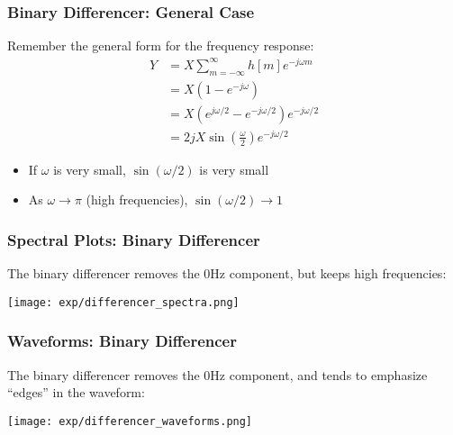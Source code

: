 \documentclass{beamer}
\begin{document}
\begin{frame}
  \frametitle{Binary Differencer: General Case}

  Remember the general form for the frequency response:
  \begin{align*}
    Y &= X\sum_{m=-\infty}^\infty h[m]e^{-j\omega m}\\
    &= X\left(1-e^{-j\omega}\right)\\
    &= X\left(e^{j\omega/2}-e^{-j\omega/2}\right)e^{-j\omega/2}\\
    &= 2jX\sin\left(\frac{\omega}{2}\right)e^{-j\omega/2}
  \end{align*}
  \begin{itemize}
  \item If $\omega$ is very small, $\sin(\omega/2)$ is very small
  \item As $\omega\rightarrow\pi$ (high frequencies), $\sin(\omega/2)\rightarrow 1$
  \end{itemize}
\end{frame}

\begin{frame}
  \frametitle{Spectral Plots: Binary Differencer}

  The binary differencer removes the 0Hz component, but keeps high frequencies:
  \centerline{\texttt{[image: exp/differencer\_spectra.png]}}
\end{frame}

\begin{frame}
  \frametitle{Waveforms: Binary Differencer}

  The binary differencer removes the 0Hz component, and tends to
  emphasize ``edges'' in the waveform:
  \centerline{\texttt{[image: exp/differencer\_waveforms.png]}}
\end{frame}


\end{document}
